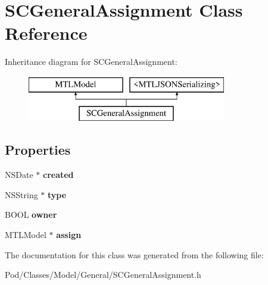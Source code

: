 \hypertarget{interface_s_c_general_assignment}{}\section{S\+C\+General\+Assignment Class Reference}
\label{interface_s_c_general_assignment}
Inheritance diagram for S\+C\+General\+Assignment\+:\begin{figure}[H]
\begin{center}
\leavevmode
\includegraphics[height=2.000000cm]{interface_s_c_general_assignment}
\end{center}
\end{figure}
\subsection*{Properties}
\begin{DoxyCompactItemize}
\item 
N\+S\+Date $\ast$ {\bfseries created}\hypertarget{interface_s_c_general_assignment_a2807d6816a3083a64886e4bec7852f0e}{}\label{interface_s_c_general_assignment_a2807d6816a3083a64886e4bec7852f0e}

\item 
N\+S\+String $\ast$ {\bfseries type}\hypertarget{interface_s_c_general_assignment_aea27904a32215ccc6e74da654a3c74f0}{}\label{interface_s_c_general_assignment_aea27904a32215ccc6e74da654a3c74f0}

\item 
B\+O\+OL {\bfseries owner}\hypertarget{interface_s_c_general_assignment_a43eddc86802e99c06279f79173eb52c3}{}\label{interface_s_c_general_assignment_a43eddc86802e99c06279f79173eb52c3}

\item 
M\+T\+L\+Model $\ast$ {\bfseries assign}\hypertarget{interface_s_c_general_assignment_abda46eb85ef868cf93b5042ab59adb19}{}\label{interface_s_c_general_assignment_abda46eb85ef868cf93b5042ab59adb19}

\end{DoxyCompactItemize}


The documentation for this class was generated from the following file\+:\begin{DoxyCompactItemize}
\item 
Pod/\+Classes/\+Model/\+General/S\+C\+General\+Assignment.\+h\end{DoxyCompactItemize}
